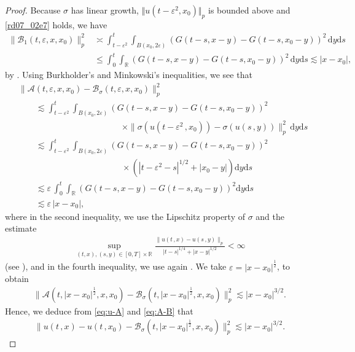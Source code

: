 \documentclass[12pt,a4paper]{article}
\newcommand{\R}{{\mathbb{R}}}
\renewcommand{\d}{\mathrm{d}}
\newcommand {\ep}{{\varepsilon}}
\newcommand {\half}{\frac 12}
\newcommand{\<}{\langle}
\renewcommand{\>}{\rangle}
\begin{document}
\begin{proof}
Because $\sigma$ has linear growth, $\Vert u(t - \varepsilon^2, x_0) \Vert_p$ is bounded above and \eqref{rd07_02e7} holds, we have
\begin{align}\label{eq:B1}
\|\mathcal{B}_1(t, \varepsilon, x, x_0)\|^2_p& \asymp \int_{t-\varepsilon^2}^t\int_{B(x_0, 2\varepsilon)} (G(t-s, x-y)- G(t-s, x_0-y))^2\, \d y\d s\nonumber\\
 &\leq \int_{0}^t\int_{\R} (G(t-s, x-y)- G(t-s, x_0-y))^2 \, \d y\d s \lesssim |x-x_0|,
\end{align}
by \cite[(4.3.10)]{dss}. Using Burkholder's and Minkowski's inequalities, we see that
\begin{align*}
           &\|\mathcal{A}(t, \varepsilon, x, x_0)-\mathcal{B}_\sigma(t, \varepsilon, x, x_0)\|_p^2 \\
           &\qquad \lesssim \int_{t-\varepsilon^2}^t\int_{B(x_0, 2\varepsilon)} (G(t-s, x-y)- G(t-s, x_0-y))^2  \\
           &\qquad\qquad\qquad\qquad \qquad\qquad\times  \| \sigma(u(t-\varepsilon^2\,,x_0)) -\sigma(u(s\,,y))\|_p^2 \, \d y\d s\\
           &\qquad \lesssim \int_{t-\varepsilon^2}^t\int_{B(x_0, 2\varepsilon)} (G(t-s, x-y)- G(t-s, x_0-y))^2   \\
           & \qquad\qquad\qquad\qquad \qquad\qquad\times  (|t-\varepsilon^2-s|^{1/2}+|x_0-y|)\d y\d s\\
           &\qquad \lesssim \varepsilon\,   \int_{0}^t\int_{\R} (G(t-s, x-y)- G(t-s, x_0-y))^2  \d y\d s \\
           &\qquad \lesssim \varepsilon\, |x-x_0|,
           \end{align*}
           where in the second inequality, we use the Lipschitz property of $\sigma$ and the estimate
           \begin{align*}
           \sup_{(t,x), (s,y)\in [0, T]\times \R}\frac{\|u(t\,,x)-u(s\,,y)\|_p}{|t-s|^{1/4}+|x-y|^{1/2}}<\infty 
\end{align*}
(see \cite[Proposition 4.3.2]{dss}),           and in the fourth inequality, we use again \cite[(4.3.10)]{dss}. We take $\ep = |x-x_0|^\half$, to obtain 
           \begin{align}\label{eq:A-B}
           \|\mathcal{A}(t, |x-x_0|^\half, x, x_0)-\mathcal{B}_\sigma(t, |x-x_0|^\half, x, x_0)\|_p^2 \lesssim |x-x_0|^{3/2}.
           \end{align}
Hence, we deduce from \eqref{eq:u-A} and \eqref{eq:A-B} that
          \begin{align}\label{eq:u-B}
           \|u(t\,,x)- u(t\,,x_0) - \mathcal{B}_\sigma(t,|x-x_0|^\half, x, x_0)\|^2_p \lesssim |x-x_0|^{3/2}.
           \end{align}
           

\end{proof}
\end{document}
